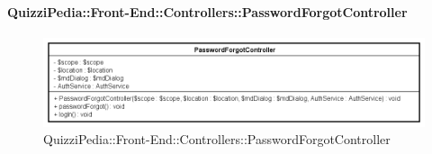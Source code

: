 \paragraph{QuizziPedia::Front-End::Controllers::PasswordForgotController}
\begin{figure} [ht]
	\centering
	\includegraphics[scale=0.7]{UML/Classi/Front-End/QuizziPedia_Front-end_Controller_PasswordForgotController.png}
	\caption{QuizziPedia::Front-End::Controllers::PasswordForgotController}
\end{figure} \FloatBarrier
